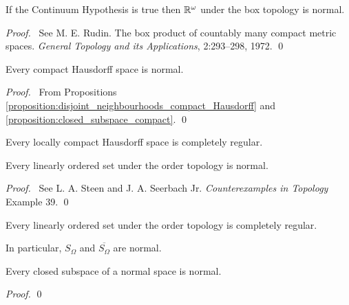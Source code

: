 \begin{theorem}
    If the Continuum Hypothesis is true then $\mathbb{R}^\omega$ under the box topology
    is normal.
\end{theorem}

\begin{proof}
    \pf\ See M. E. Rudin. The box product of countably many compact metric spaces.
    \emph{General Topology and its Applications}, 2:293--298, 1972. \qed
\end{proof}

\begin{theorem}
    Every compact Hausdorff space is normal.
\end{theorem}

\begin{proof}
    \pf\ From Propositions \ref{proposition:disjoint_neighbourhoods_compact_Hausdorff}
    and \ref{proposition:closed_subspace_compact}. \qed
\end{proof}

\begin{corollary}
    Every locally compact Hausdorff space is completely regular.
\end{corollary}

\begin{theorem}
    Every linearly ordered set under the order topology is normal.
\end{theorem}

\begin{proof}
    \pf\ See L. A. Steen and J. A. Seerbach Jr. \emph{Counterexamples in
    Topology} Example 39. \qed
\end{proof}

\begin{corollary}
    \label{corollary:order_topology_completely_regular}
    Every linearly ordered set under the order topology is completely regular.
\end{corollary}

\begin{example}
    In particular, $S_\Omega$ and $\overline{S_\Omega}$ are normal.
\end{example}

\begin{proposition}
    \label{proposition:closed_subspace_normal}
    Every closed subspace of a normal space is normal.
\end{proposition}

\begin{proof}
    \pf
    \qed
\end{proof}

